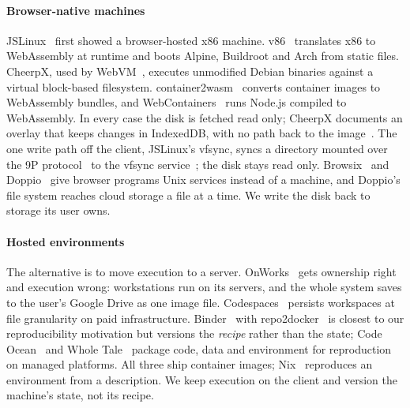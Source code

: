 \documentclass[journal,10pt]{IEEEtran}
\begin{document}
\paragraph{Browser-native machines}
JSLinux~\cite{jslinux} first showed a browser-hosted x86 machine.
v86~\cite{v86} translates x86 to WebAssembly at runtime and boots Alpine,
Buildroot and Arch from static files. CheerpX, used by WebVM~\cite{webvm},
executes unmodified Debian binaries against a virtual block-based filesystem.
container2wasm~\cite{c2w} converts container images to WebAssembly bundles, and
WebContainers~\cite{webcontainers} runs Node.js compiled to WebAssembly. In
every case the disk is fetched read only; CheerpX documents an overlay that
keeps changes in IndexedDB, with no path back to the image~\cite{cheerpx}. The one write path
off the client, JSLinux's vfsync, syncs a directory mounted over the 9P
protocol~\cite{jslinuxtech} to the vfsync service~\cite{vfsync}; the disk stays read only.
Browsix~\cite{browsix} and Doppio~\cite{doppio} give browser programs Unix
services instead of a machine, and Doppio's file system reaches cloud storage a
file at a time. We write the disk back to storage its user owns.

\paragraph{Hosted environments}
The alternative is to move execution to a server. OnWorks~\cite{onworks} gets
ownership right and execution wrong: workstations run on its servers, and the
whole system saves to the user's Google Drive as one image file.
Codespaces~\cite{codespaces} persists workspaces at file granularity on paid
infrastructure. Binder~\cite{binder} with
repo2docker~\cite{repo2docker} is closest to our reproducibility motivation but
versions the \emph{recipe} rather than the state; Code Ocean~\cite{codeocean}
and Whole Tale~\cite{wholetale} package code, data and environment for
reproduction on managed platforms. All three ship container images;
Nix~\cite{nix} reproduces an environment from a description. We keep execution
on the client and version the machine's state, not its recipe.
\end{document}
